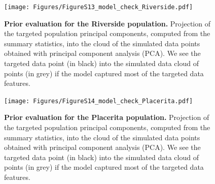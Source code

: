 \documentclass[a4paper, 12pt]{article}
\begin{document}
\begin{figure}[ht]
  \centering
  \texttt{[image: Figures/FigureS13\_model\_check\_Riverside.pdf]}
  \small\caption{\textbf{Prior evaluation for the Riverside population.} Projection of the targeted population principal components, computed from the summary statistics, into the cloud of the simulated data points obtained with principal component analysis (PCA). We see the targeted data point (in black) into the simulated data cloud of points (in grey) if the model captured most of the targeted data features.}
  \label{fig:supple_model_check_riverside}
\end{figure}

\begin{figure}[ht]
  \centering
  \texttt{[image: Figures/FigureS14\_model\_check\_Placerita.pdf]}
  \small\caption{\textbf{Prior evaluation for the Placerita population.} Projection of the targeted population principal components, computed from the summary statistics, into the cloud of the simulated data points obtained with principal component analysis (PCA). We see the targeted data point (in black) into the simulated data cloud of points (in grey) if the model captured most of the targeted data features.}
  \label{fig:supple_model_check_placerita}
\end{figure}
\end{document}

